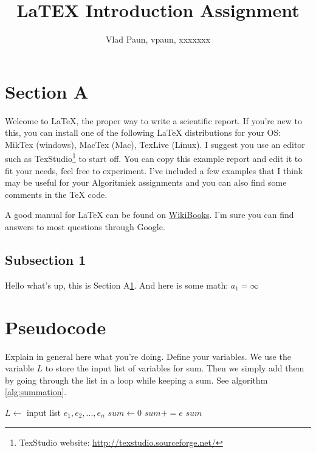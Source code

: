 \documentclass[11pt,twoside,a4paper]{article}
\title{LaTEX Introduction Assignment} %
\author{
	Vlad Paun, vpaun, xxxxxxx %
}
\begin{document}
\maketitle
\clearpage

\tableofcontents
\listofalgorithms

\section{Section A} \label{sec:sectionA} %
	Welcome to \LaTeX, the proper way to write a scientific report.	If you're new to this, you can install one of the following LaTeX distributions for your OS: MikTex (windows), MacTex (Mac), TexLive (Linux). I suggest you use an editor such as TexStudio\footnote{TexStudio website: \url{http://texstudio.sourceforge.net/}} to start off. You can copy this example report and edit it to fit your needs, feel free to experiment. I've included a few examples that I think may be useful for your Algoritmiek assignments and you can also find some comments in the TeX code.

	A good manual for LaTeX can be found on \href{http://en.wikibooks.org/wiki/LaTeX}{WikiBooks}. I'm sure you can find answers to most questions through Google.

	\subsection{Subsection 1}
		Hello what's up, this is Section A\ref{sec:sectionA}. And here is some math: $ a_1 = \infty $

\section{Pseudocode}
	Explain in general here what you're doing. Define your variables.
	We use the variable $L$ to store the input list of variables for sum. %
	Then we simply add them by going through the list in a loop while keeping a sum. See algorithm \ref{alg:summation}.

	\begin{algorithm}
		\caption{Summation in a list}
		\label{alg:summation}
		\begin{algorithmic}
			\State $L \gets$ input list $e_1,e_2,...,e_n$
			\State $sum \gets 0$
			 
				\State $sum += e$
			\EndFor
			\State \Return $sum$
		\end{algorithmic}
	\end{algorithm}
\end{document}
